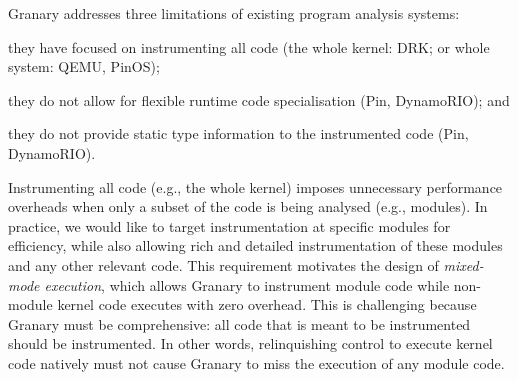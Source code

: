 \documentclass[preprint]{sigplanconf}
\begin{document}

Granary addresses three limitations of existing program analysis systems: \begin{inparaenum}[i)]
	\item they have focused on instrumenting all code (the whole kernel: DRK; or whole system: QEMU, PinOS);
	\item they do not allow for flexible runtime code specialisation (Pin, DynamoRIO); and
	\item they do not provide static type information to the instrumented code (Pin, DynamoRIO).
\end{inparaenum} 


Instrumenting all code (e.g., the whole kernel) imposes unnecessary performance overheads when only a subset of the code is being analysed (e.g., modules). In practice, we would like to target instrumentation at specific modules for efficiency, while also allowing rich and detailed instrumentation of these modules and any other relevant code. This requirement motivates the design of \emph{mixed-mode execution}, which allows Granary to instrument module code while non-module kernel code executes with zero overhead. This is challenging because Granary must be comprehensive: all code that is meant to be instrumented should be instrumented. In other words, relinquishing control to execute kernel code natively must not cause Granary to miss the execution of any module code. %
\end{document}
